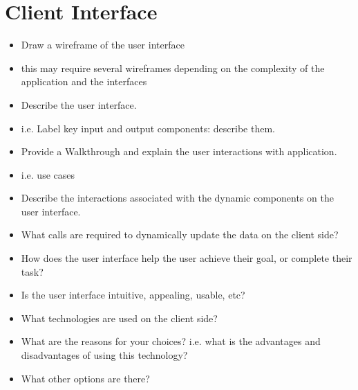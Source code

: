 \documentclass{sig-alt-release2}
\begin{document}
\section{Client Interface}
\begin{itemize}
\item	Draw a wireframe of the user interface %
\item	this may require several wireframes depending on the complexity of the application and the interfaces %
\item	Describe the user interface. 
\item	i.e. Label key input and output components: describe them.
\item	Provide a Walkthrough and explain the user interactions with application. %
\item	i.e. use cases
\item	Describe the interactions associated with the dynamic components on the user interface. %
\item	What calls are required to dynamically update the data on the client side?
\item	How does the user interface help the user achieve their goal, or complete their task? 
\item	Is the user interface intuitive, appealing, usable, etc?
\item	What technologies are used on the client side? %
\item	What are the reasons for your choices? i.e. what is the advantages and disadvantages of using this technology? %
\item	What other options are there? 
\end{itemize}
\end{document}

